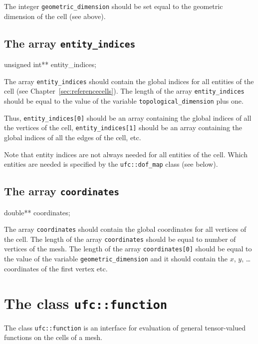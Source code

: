 The integer \texttt{geometric\_dimension} should be set equal to the
geometric dimension of the cell (see above).

\subsection{The array \texttt{entity\_indices}}

\begin{code}
unsigned int** entity_indices;
\end{code}

The array \texttt{entity\_indices} should contain the global indices
for all entities of the cell (see Chapter~\ref{sec:referencecells}).
The length of the array \texttt{entity\_indices} should be equal to
the value of the variable \texttt{topological\_dimension} plus one.

Thus, \texttt{entity\_indices[0]} should be an array containing the
global indices of all the vertices of the cell,
\texttt{entity\_indices[1]} should be an array containing the global
indices of all the edges of the cell, etc. 

Note that entity indices are not always needed for all entities of the
cell. Which entities are needed is specified by the
\texttt{ufc::dof\_map} class (see below).

\subsection{The array \texttt{coordinates}}

\begin{code}
double** coordinates;
\end{code}

The array \texttt{coordinates} should contain the global coordinates
for all vertices of the cell. The length of the array
\texttt{coordinates} should be equal to number of vertices of the
mesh. The length of the array \texttt{coordinates[0]} should be equal
to the value of the variable \texttt{geometric\_dimension} and it
should contain the $x$, $y$, \ldots coordinates of the first
vertex etc.

\section{The class \texttt{ufc::function}}

The class \texttt{ufc::function} is an interface for evaluation of
general tensor-valued functions on the cells of a mesh.

